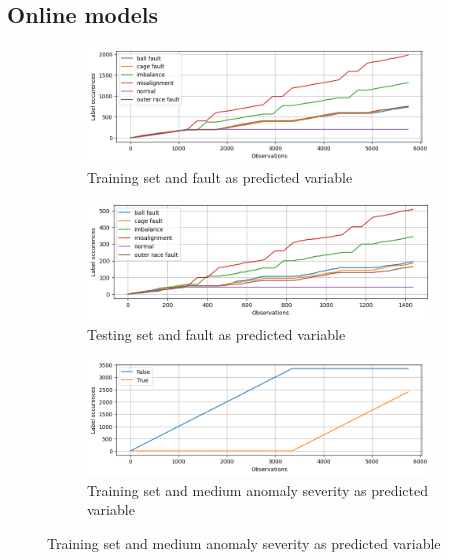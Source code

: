 

\subsection{Online models}

\begin{figure}[ht]
    \centering
    \begin{subfigure}[b]{0.49\textwidth}
        \includegraphics[width=\textwidth]{assets/design/Online-event-ordering-fault-train.png}
        \caption{Training set and fault as predicted variable}
    \end{subfigure}
    \hfill
    \begin{subfigure}[b]{0.49\textwidth}
        \includegraphics[width=\textwidth]{assets/design/Online-event-ordering-fault-test.png}
        \caption{Testing set and fault as predicted variable}
    \end{subfigure}
    \begin{subfigure}[b]{0.49\textwidth}
        \includegraphics[width=\textwidth]{assets/design/Online-event-ordering-anomaly60-train.png}
        \caption{Training set and medium anomaly severity as predicted variable}

\end{subfigure}
\end{figure}
